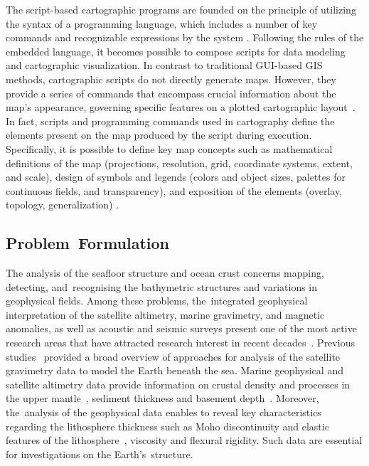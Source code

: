 \documentclass[geomatics,article,accept,pdftex,moreauthors]{Definitions/mdpi}
\begin{document}
The script-based cartographic programs are founded on the principle of utilizing the syntax of a programming language, which includes a number of key commands and recognizable expressions by the system \cite{6057428}. Following the rules of the embedded language, it becomes possible to compose scripts for data modeling and cartographic visualization. In contrast to traditional GUI-based GIS methods, cartographic scripts do not directly generate maps. However, they provide a series of commands that encompass crucial information about the map's appearance, governing specific features on a plotted cartographic layout~\cite{Lemenkova202215}. In fact, scripts and programming commands used in cartography define the elements present on the map produced by the script during execution. Specifically, it is possible to define key map concepts such as mathematical definitions of the map (projections, resolution, grid, coordinate systems, extent, and scale), design of symbols and legends (colors and object sizes, palettes for continuous fields, and transparency), and exposition of the elements (overlay, topology, generalization) \cite{ABER201753}.

\subsection{Problem~Formulation}
The analysis of the seafloor structure and ocean crust concerns mapping, detecting, and~recognising the bathymetric structures and variations in geophysical fields. Among these problems, the~integrated geophysical interpretation of the satellite altimetry, marine gravimetry, and magnetic anomalies, as well as acoustic and seismic surveys present one of the most active research areas that have attracted research interest in recent decades~\cite{Bascou}. Previous studies~\cite{ESHAGH2021313} provided a broad overview of approaches for analysis of the satellite gravimetry data to model the Earth beneath the sea. Marine geophysical and satellite altimetry data provide information on crustal density and processes in the upper mantle~\cite{KAPAWAR2021106692,PENG2022110823,ZHANG202368}, sediment thickness and basement depth~\cite{Lemenkova202005}. Moreover, the~analysis of the geophysical data enables to reveal key characteristics regarding the lithosphere thickness such as Moho discontinuity and elastic features of the lithosphere~\cite{TESAURO201378}, viscosity and flexural rigidity. Such data are essential for investigations on the Earth's~structure.
\end{document}
